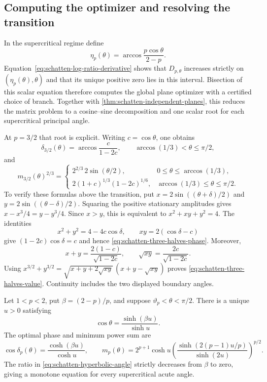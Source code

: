 \subsection{Computing the optimizer and resolving the transition}

In the supercritical regime define
\[
 \eta_p(\theta)=\arccos\frac{p\cos\theta}{2-p}.
\]
Equation~\eqref{eq:schatten-log-ratio-derivative} shows that
$D_{p,\theta}$ increases strictly on
$(\eta_p(\theta),\theta)$ and that its unique positive zero lies in
this interval. Bisection of this scalar equation therefore computes the
global plane optimizer with a certified choice of branch. Together with
\cref{thm:schatten-independent-planes}, this reduces the matrix problem
to a cosine--sine decomposition and one scalar root for each supercritical
principal angle.

At $p=3/2$ that root is explicit. Writing $c=\cos\theta$, one obtains
\begin{equation}
 \delta_{3/2}(\theta)=\arccos\frac{c}{1-2c},\qquad
       \arccos(1/3)<\theta\leq\pi/2,
 \label{eq:schatten-three-halves-phase}
\end{equation}
and
\begin{equation}
 m_{3/2}(\theta)^{2/3}=
 \begin{cases}
  2^{2/3}\,2\sin(\theta/2),&0\leq\theta\leq\arccos(1/3),\\
  2(1+c)^{1/3}(1-2c)^{1/6},&\arccos(1/3)\leq\theta\leq\pi/2.
 \end{cases}
 \label{eq:schatten-three-halves-value}
\end{equation}
To verify these formulas above the transition, put
$x=2\sin((\theta+\delta)/2)$ and
$y=2\sin((\theta-\delta)/2)$. Squaring the positive stationary
amplitudes gives $x-x^3/4=y-y^3/4$. Since $x>y$, this is equivalent to
$x^2+xy+y^2=4$. The identities
\[
 x^2+y^2=4-4c\cos\delta,\qquad
 xy=2(\cos\delta-c)
\]
give $(1-2c)\cos\delta=c$ and hence
\cref{eq:schatten-three-halves-phase}. Moreover,
\[
 x+y=\frac{2(1-c)}{\sqrt{1-2c}},\qquad
 \sqrt{xy}=\frac{2c}{\sqrt{1-2c}}.
\]
Using $x^{3/2}+y^{3/2}
=\sqrt{x+y+2\sqrt{xy}}\,(x+y-\sqrt{xy})$ proves
\cref{eq:schatten-three-halves-value}. Continuity includes the two
displayed boundary angles.

\begin{proposition}
\label{prop:schatten-hyperbolic-phase}
Let $1<p<2$, put $\beta=(2-p)/p$, and suppose
$\vartheta_p<\theta<\pi/2$. There is a unique $u>0$ satisfying
\begin{equation}
 \cos\theta=\frac{\sinh(\beta u)}{\sinh u}.
 \label{eq:schatten-hyperbolic-angle}
\end{equation}
The optimal phase and minimum power sum are
\begin{equation}
 \cos\delta_p(\theta)=\frac{\cosh(\beta u)}{\cosh u},\qquad
 m_p(\theta)=2^{p+1}\cosh u
     \left(\frac{\sinh(2(p-1)u/p)}{\sinh(2u)}\right)^{p/2}.
 \label{eq:schatten-hyperbolic-value}
\end{equation}
The ratio in \cref{eq:schatten-hyperbolic-angle} strictly decreases
from $\beta$ to zero, giving a monotone equation for every supercritical
acute angle.
\end{proposition}

